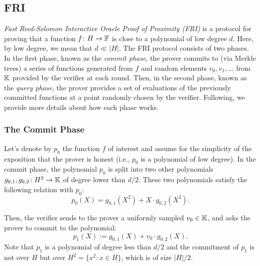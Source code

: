\subsection{FRI}\label{sec:FRI}

\textit{Fast Reed-Solomon Interactive Oracle Proof of Proximity (FRI)} \cite{EPRINT:BCIKS20} is a protocol for proving that a function $f \colon H \to \mathbb{F}$ is close to a polynomial of low degree $d$. Here, by low degree, we mean that $d \ll |H|$.
The FRI protocol consists of two phases. In the first phase, known as the \textit{commit phase}, the prover commits to (via Merkle trees) a series of functions generated from $f$ and random elements $v_0,v_1,\dots$ from $\mathbb{K}$ provided by the verifier at each round.
Then, in the second phase, known as the \textit{query phase}, the prover provides a set of evaluations of the previously committed functions at a point randomly chosen by the verifier. 
Following, we provide more details about how each phase works.



\subsubsection*{The Commit Phase}

Let's denote by $p_0$ the function $f$ of interest and assume for the simplicity of the exposition that the prover is honest (i.e., $p_0$ is a polynomial of low degree).
In the commit phase, the polynomial $p_0$ is split into two other polynomials $g_{0, 1}, g_{0, 2} \colon H^2 \to \mathbb{K}$ of degree lower than $d/2$. These two polynomials satisfy the following relation with $p_0$:
\begin{equation}\label{eq:FRI-relation}
p_0(X) = g_{0, 1}(X^2) + X \cdot g_{0, 2}(X^2).
\end{equation}

Then, the verifier sends to the prover a uniformly sampled $v_0 \in \mathbb{K}$, and asks the prover to commit to the polynomial:
\[
p_1(X) := g_{0, 1}(X) + v_0 \cdot g_{0, 2}(X).
\]
Note that $p_1$ is a polynomial of degree less than $d/2$ and the commitment of $p_1$ is not over $H$ but over $H^2 = \{x^2 \colon x \in H\}$, which is of size $|H|/2$.

